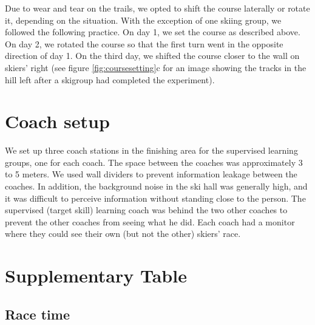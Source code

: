 \documentclass[pdflatex,sn-mathphys-num]{sn-jnl}%
\theoremstyle{thmstyleone}%
\theoremstyle{thmstyletwo}%
\theoremstyle{thmstylethree}%
\begin{document}
\begin{appendices}
Due to wear and tear on the trails, we opted to shift the course laterally or rotate it, depending on the situation. With the exception of one skiing group, we followed the following practice. On day 1, we set the course as described above. On day 2, we rotated the course so that the first turn went in the opposite direction of day 1. On the third day, we shifted the course closer to the wall on skiers' right (see figure \ref{fig:coursesetting}c for an image showing the tracks in the hill left after a skigroup had completed the experiment). 


\section{Coach setup}
We set up three coach stations in the finishing area for the supervised learning groups, one for each coach. The space between the coaches was approximately 3 to 5 meters. We used wall dividers to prevent information leakage between the coaches. In addition, the background noise in the ski hall was generally high, and it was difficult to perceive information without standing close to the person. The supervised (target skill) learning coach was behind the two other coaches to prevent the other coaches from seeing what he did. Each coach had a monitor where they could see their own (but not the other) skiers' race.


\section{Supplementary Table}

\subsection{Race time}


\end{appendices}
\end{document}
